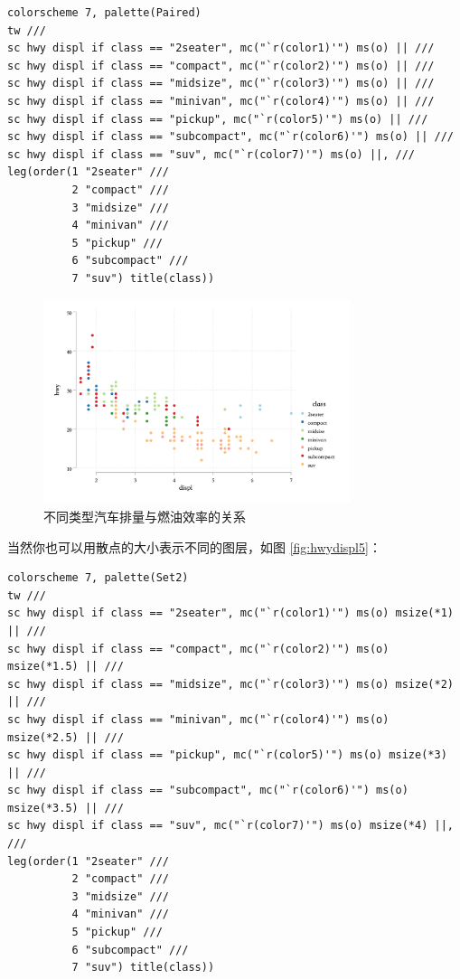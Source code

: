 \documentclass[]{ctexbook}
\begin{document}
\begin{lstlisting}
colorscheme 7, palette(Paired)
tw ///
sc hwy displ if class == "2seater", mc("`r(color1)'") ms(o) || ///
sc hwy displ if class == "compact", mc("`r(color2)'") ms(o) || ///
sc hwy displ if class == "midsize", mc("`r(color3)'") ms(o) || ///
sc hwy displ if class == "minivan", mc("`r(color4)'") ms(o) || ///
sc hwy displ if class == "pickup", mc("`r(color5)'") ms(o) || ///
sc hwy displ if class == "subcompact", mc("`r(color6)'") ms(o) || ///
sc hwy displ if class == "suv", mc("`r(color7)'") ms(o) ||, ///
leg(order(1 "2seater" ///
          2 "compact" ///
          3 "midsize" ///
          4 "minivan" ///
          5 "pickup" ///
          6 "subcompact" ///
          7 "suv") title(class))
\end{lstlisting}

\begin{figure}

{\centering \includegraphics[width=0.8\textwidth]{assets/hwydispl4} 

}

\caption{不同类型汽车排量与燃油效率的关系}\label{fig:hwydispl4}
\end{figure}

当然你也可以用散点的大小表示不同的图层，如图 \ref{fig:hwydispl5}：

\begin{lstlisting}
colorscheme 7, palette(Set2)
tw ///
sc hwy displ if class == "2seater", mc("`r(color1)'") ms(o) msize(*1) || ///
sc hwy displ if class == "compact", mc("`r(color2)'") ms(o) msize(*1.5) || ///
sc hwy displ if class == "midsize", mc("`r(color3)'") ms(o) msize(*2) || ///
sc hwy displ if class == "minivan", mc("`r(color4)'") ms(o) msize(*2.5) || ///
sc hwy displ if class == "pickup", mc("`r(color5)'") ms(o) msize(*3) || ///
sc hwy displ if class == "subcompact", mc("`r(color6)'") ms(o) msize(*3.5) || ///
sc hwy displ if class == "suv", mc("`r(color7)'") ms(o) msize(*4) ||, ///
leg(order(1 "2seater" ///
          2 "compact" ///
          3 "midsize" ///
          4 "minivan" ///
          5 "pickup" ///
          6 "subcompact" ///
          7 "suv") title(class))
\end{lstlisting}
\end{document}
